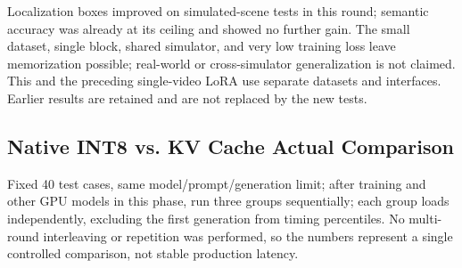 
Localization boxes improved on simulated-scene tests in this round; semantic accuracy was already at its ceiling and showed no further gain. The small dataset, single block, shared simulator, and very low training loss leave memorization possible; real-world or cross-simulator generalization is not claimed. This and the preceding single-video LoRA use separate datasets and interfaces. Earlier results are retained and are not replaced by the new tests.

\subsection{Native INT8 vs. KV Cache Actual Comparison}\label{s04-detail-4}

Fixed 40 test cases, same model/prompt/generation limit; after training and other GPU models in this phase, run three groups sequentially; each group loads independently, excluding the first generation from timing percentiles. No multi-round interleaving or repetition was performed, so the numbers represent a single controlled comparison, not stable production latency.

